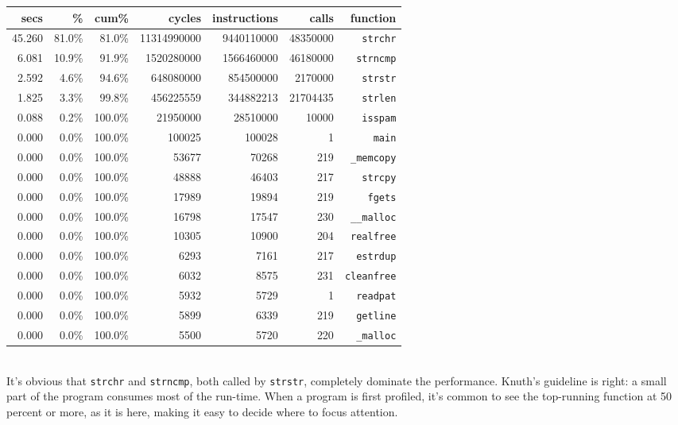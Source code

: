 \begin{tabular}{rrrrrrr}
    secs    & \%    & cum\% & cycles    & instructions  & calls & function
    \\
    \hline
    \hline
    45.260  & 81.0\%    & 81.0\%    & 11314990000   & 9440110000    &
    48350000    & \verb'strchr' \\
    6.081   & 10.9\%    & 91.9\%    & 1520280000    & 1566460000    &
    46180000    & \verb'strncmp'    \\
    2.592   & 4.6\%     & 94.6\%    & 648080000     & 854500000     &
    2170000 & \verb'strstr' \\
    1.825   & 3.3\%     & 99.8\%    & 456225559     & 344882213     &
    21704435    & \verb'strlen' \\
    0.088   & 0.2\%     & 100.0\%   & 21950000      & 28510000      & 10000
    & \verb'isspam' \\
    0.000   & 0.0\%     & 100.0\%   & 100025    & 100028    & 1 &
    \verb'main'   \\
    0.000   & 0.0\%     & 100.0\%   & 53677     & 70268     & 219   &
    \verb'_memcopy' \\
    0.000   & 0.0\%     & 100.0\%   & 48888     & 46403     & 217   &
    \verb'strcpy'   \\
    0.000   & 0.0\%     & 100.0\%   & 17989     & 19894     & 219   &
    \verb'fgets'    \\
    0.000   & 0.0\%     & 100.0\%   & 16798     & 17547     & 230   &
    \verb'__malloc' \\
    0.000   & 0.0\%     & 100.0\%   & 10305     & 10900      & 204  &
    \verb'realfree' \\
    0.000   & 0.0\%     & 100.0\%   &  6293     & 7161      & 217   &
    \verb'estrdup'  \\
    0.000   & 0.0\%     & 100.0\%   & 6032      & 8575      & 231   &
    \verb'cleanfree'    \\
    0.000   & 0.0\%     & 100.0\%   & 5932      & 5729      & 1     &
    \verb'readpat'  \\
    0.000   & 0.0\%     & 100.0\%   & 5899      & 6339      & 219   &
    \verb'getline'  \\
    0.000   & 0.0\%     & 100.0\%   & 5500      & 5720      & 220   &
    \verb'_malloc'  \\
\end{tabular} \\

It's obvious that \verb'strchr' and \verb'strncmp', both called by
\verb'strstr', completely dominate the performance. Knuth's guideline is
right: a small part of the program consumes most of the run-time. When a
program is first profiled, it's common to see the top-running function at
50 percent or more, as it is here, making it easy to decide where to focus
attention.

